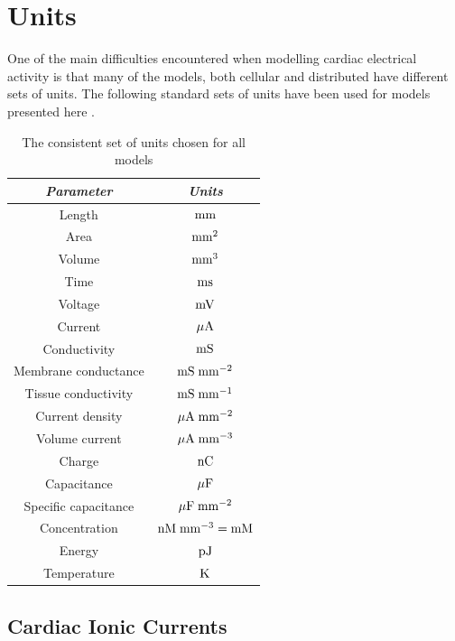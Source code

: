 \section{Units}
\label{sec:Units}
One of the main difficulties encountered when modelling cardiac electrical
activity is that many of the models, both cellular and distributed have
different sets of units. The following standard sets of units have been used
for models presented here .
\begin{table}[hbtp] \centering
  \begin{tabular}{|c|c|}
    \hline
    \emph{Parameter} & \emph{Units} \\ 
    \hline
    \hline 
     Length & $\mathrm{mm}$ \\
     Area & $\mathrm{mm}^2$ \\
     Volume & $\mathrm{mm}^3$ \\
     Time &  $\mathrm{ms}$ \\
     Voltage & $\mathrm{mV}$ \\
     Current & $\mathrm{\mu A}$ \\
     Conductivity & $\mathrm{mS}$  \\
     Membrane conductance & $\mathrm{mS}\thickspace\mathrm{mm}^{-2}$ \\
     Tissue conductivity & $\mathrm{mS}\thickspace\mathrm{mm}^{-1}$ \\
     Current density & $\mathrm{\mu A}\thickspace\mathrm{mm}^{-2}$  \\
     Volume current & $\mathrm{\mu A}\thickspace\mathrm{mm}^{-3}$  \\
     Charge & $\mathrm{nC}$  \\
     Capacitance & $\mathrm{\mu F}$  \\
     Specific capacitance & $\mathrm{\mu F}\thickspace\mathrm{mm}^{-2}$  \\
     Concentration & $\mathrm{nM}\thickspace\mathrm{mm}^{-3} = \mathrm{mM}$  \\ 
     Energy & $\mathrm{pJ}$  \\ 
     Temperature & $\mathrm{K}$  \\ 
    \hline
  \end{tabular}
  \caption[Consistent units set]{The consistent set of units chosen for all
    models}
  \label{tab:consist_units}
\end{table}


\subsection{Cardiac Ionic Currents}

